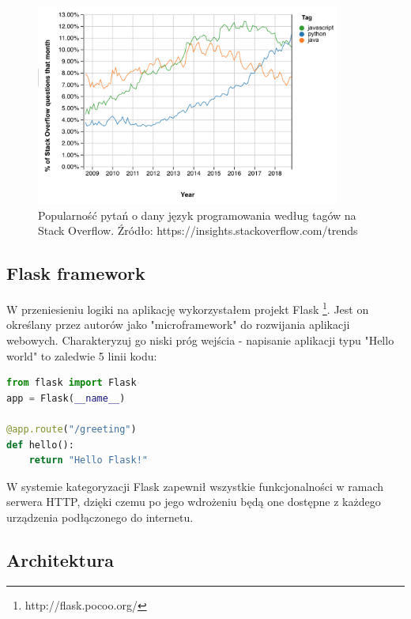 \begin{enumerate}
    \begin{figure}[H]
        \centering
        \includegraphics[width=10cm]{python_popularity.png}
        \caption{Popularność pytań o dany język programowania według tagów na Stack Overflow. Źródło: https://insights.stackoverflow.com/trends}
        \label{fig:python_popularity}
    \end{figure}
    
\end{enumerate}

\subsection{Flask framework}

W przeniesieniu logiki na aplikację wykorzystałem projekt Flask \footnote{http://flask.pocoo.org/}. Jest on określany przez autorów jako "microframework" do rozwijania aplikacji webowych. Charakteryzuj go niski próg wejścia - napisanie aplikacji typu "Hello world" to zaledwie 5 linii kodu:

\begin{lstlisting}[language=Python]
from flask import Flask
app = Flask(__name__)

@app.route("/greeting")
def hello():
    return "Hello Flask!"
\end{lstlisting}

W systemie kategoryzacji Flask zapewnił wszystkie funkcjonalności w ramach serwera HTTP, dzięki czemu po jego wdrożeniu będą one dostępne z każdego urządzenia podłączonego do internetu.

\subsection{Architektura}

